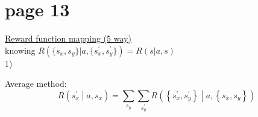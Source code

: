 \section*{page 13}

\underline{Reward function mapping (5 way)}\\

knowing $R\left(\{s_x, s_y\}|a, \{s^\prime_x,s^\prime_y\}\right)=R(s|a,s)$\\

1)\ 
\begin{minipage}[t]{0.9\textwidth}Average method:\\
\begin{equation*}
R\left(s^\prime_x\middle|a,s_x\right)=\sum_{s_y}\sum_{s^\prime_y}R\left(\left\{s^\prime_x,s^\prime_y\right\}\middle|a,\left\{s_x,s_y\right\}\right)
\end{equation*}
\end{minipage}